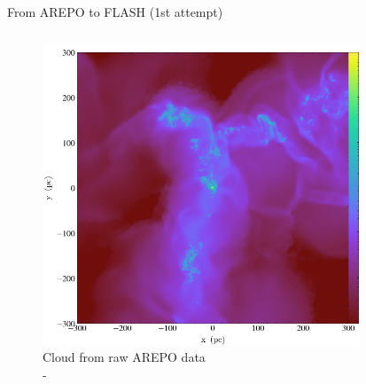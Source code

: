 \documentclass[aspectratio=169]{beamer}
\begin{document}
\begin{frame}{From AREPO to FLASH} {(1st attempt)}
    \begin{columns}
        \begin{column}{0.35\textwidth}
            \begin{figure}[h!]
                \centering
                \includegraphics[width=\linewidth]{../images/AREPO_cloud.png} \\
                Cloud from raw AREPO data \\
                -
                \label{fig:voronoi_example}
            \end{figure}
        \end{column}
        \begin{column}{0.35\textwidth}
            \begin{figure}[h!]
                \centering

\end{figure}
\end{column}
\end{columns}
\end{frame}
\end{document}
